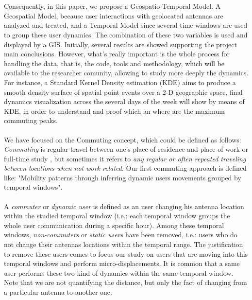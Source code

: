 \\
\\
Consequently, in this paper, we propose a Geospatio-Temporal Model. A Geospatial Model, because user interactions with geolocated antennas are analyzed and treated, and a Temporal Model since several time windows are used to group these user dynamics. The combination of these two variables is used and displayed by a GIS. Initially, several results are showed supporting the project main conclusions. However, what's really important is the whole process for handling the data, that is, the code, tools and methodology, which will be available to the researcher comunity, allowing to study more deeply the dynamics. For instance, a Standard Kernel Density estimation (KDE) aims to produce a smooth density surface of spatial point events over a 2-D geographic space\citep{SIM:SIM4780090616,5969036}, final dynamics visualization across the several days of the week will show by means of KDE, in order to understand and proof which an where are the maximum commuting peaks. 
\\
\\
We have focused on the Commuting concept, which could be defined as follows: \emph{Commuting} is regular travel between one's place of residence and place of work or full-time study \citep{wiki:commuting}, but  sometimes it refers to \emph{any regular or often repeated traveling between locations when not work related}. Our first commuting approach is defined like: "Mobility patterns through inferring dynamic users movements grouped by temporal windows". 
\\
\\
A {\it commuter} or {\it dynamic user} is defined as an user changing his antenna location within the studied temporal window (i.e.: each temporal window groups the whole user communication during a specific hour). Among these temporal windows, {\it non-commuters} or {\it static users} have been removed, i.e.: users who do not change their antennas locations within the temporal range. The justification to remove these users comes to focus our study on users that are moving into this temporal windows and perform micro-displacements. It is common that a same user performs these two kind of dynamics within the same temporal window. Note that we are not quantifying the distance, but only the fact of changing from a particular antenna to another one.